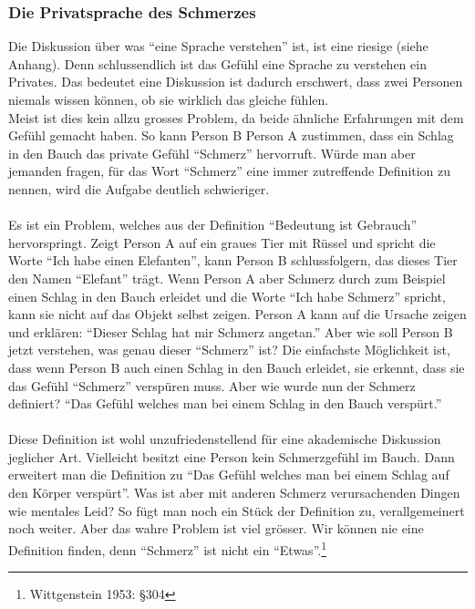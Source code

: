 \documentclass[10pt,a4paper]{article}
\begin{document}
\subsubsection{Die Privatsprache des Schmerzes}
Die Diskussion über was \enquote{eine Sprache verstehen} ist, ist eine riesige (siehe Anhang).
Denn schlussendlich ist das Gefühl eine Sprache zu verstehen ein Privates. Das bedeutet eine Diskussion ist dadurch erschwert, dass zwei Personen niemals wissen können, ob sie wirklich das gleiche fühlen. \\
Meist ist dies kein allzu grosses Problem, da beide ähnliche Erfahrungen mit dem Gefühl gemacht haben. So kann Person B Person A zustimmen, dass ein Schlag in den Bauch das private Gefühl \enquote{Schmerz} hervorruft. Würde man aber jemanden fragen, für das Wort \enquote{Schmerz} eine immer zutreffende Definition zu nennen, wird die Aufgabe deutlich schwieriger. \\
\\
Es ist ein Problem, welches aus der Definition \enquote{Bedeutung ist Gebrauch} hervorspringt. Zeigt Person A auf ein graues Tier mit Rüssel und spricht die Worte \enquote{Ich habe einen Elefanten}, kann Person B schlussfolgern, das dieses Tier den Namen \enquote{Elefant} trägt. Wenn Person A aber Schmerz durch zum Beispiel einen Schlag in den Bauch erleidet und die Worte \enquote{Ich habe Schmerz} spricht, kann sie nicht auf das Objekt selbst zeigen. Person A kann auf die Ursache zeigen und erklären: \enquote{Dieser Schlag hat mir Schmerz angetan.} Aber wie soll Person B jetzt verstehen, was genau dieser \enquote{Schmerz} ist? Die einfachste Möglichkeit ist, dass wenn Person B auch einen Schlag in den Bauch erleidet, sie erkennt, dass sie das Gefühl \enquote{Schmerz} verspüren muss. Aber wie wurde nun der Schmerz definiert? \enquote{Das Gefühl welches man bei einem Schlag in den Bauch verspürt.} \\
\\
Diese Definition ist wohl unzufriedenstellend für eine akademische Diskussion jeglicher Art. Vielleicht besitzt eine Person kein Schmerzgefühl im Bauch. Dann erweitert man die Definition zu \enquote{Das Gefühl welches man bei einem Schlag auf den Körper verspürt}. Was ist aber mit anderen Schmerz verursachenden Dingen wie mentales Leid? So fügt man noch ein Stück der Definition zu, verallgemeinert noch weiter. Aber das wahre Problem ist viel grösser. Wir können nie eine Definition finden, denn \enquote{Schmerz} ist nicht ein \enquote{Etwas}.\footnote{Wittgenstein 1953: §304}
\end{document}
